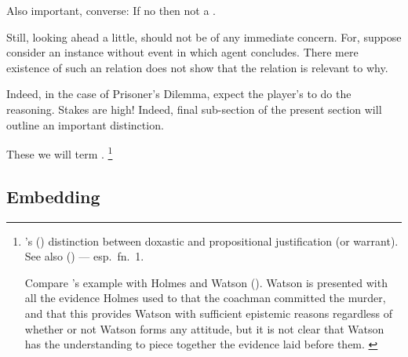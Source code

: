 \begin{note}
  Also important, converse: If no \ros{} then not a \fc{}.
\end{note}

\begin{note}
  Still, looking ahead a little, \supportII{} should not be of any immediate concern.
  For, suppose consider an instance \ros{} without event in which agent concludes.
  There mere existence of such an relation does not show that the relation is relevant to why.

  Indeed, in the case of Prisoner's Dilemma, expect the player's to do the reasoning.
  Stakes are high!
  Indeed, final sub-section of the present section will outline an important distinction.
\end{note}

\begin{note}
  These we will term .%
  \footnote{
    \citeauthor{Firth:1978vi}'s (\citeyear{Firth:1978vi}) distinction between doxastic and propositional justification (or warrant).
    See also \citeauthor{Silva:2020aa} (\citeyear{Silva:2020aa}) --- esp.\ fn.\ 1.

    {\color{red}
      Compare \citeauthor{Firth:1978vi}'s example with Holmes and Watson (\citeyear[218]{Firth:1978vi}).
      Watson is presented with all the evidence Holmes used to that the coachman committed the murder, and that this provides Watson with sufficient epistemic reasons regardless of whether or not Watson forms any attitude, but it is not clear that Watson has the understanding to piece together the evidence laid before them.
    }
  }
\end{note}



\subsection{Embedding }
\label{cha:var:support:Emb}

